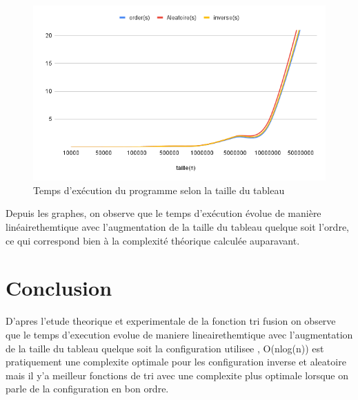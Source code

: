 \begin{figure}[H]
    \centering
        \includegraphics[scale=0.7]{ressources/chartfusion.png}
        \caption{Temps d'exécution du programme selon la taille du tableau}
    \label{fig:temps_exec_dico_theo}
\end{figure} 
\par
Depuis les graphes, on observe que le temps d’exécution évolue de manière linéairethemtique avec l’augmentation de la taille du tableau quelque soit l'ordre, ce qui correspond bien à la complexité théorique calculée auparavant.

\par
\section{Conclusion}
D'apres l'etude theorique et experimentale de la fonction tri fusion on observe que le temps d'execution evolue de maniere lineairethemtique avec l'augmentation de la taille du tableau quelque soit la configuration utilisee , O(nlog(n)) est pratiquement une complexite optimale pour les configuration inverse et aleatoire mais il y'a meilleur fonctions de tri avec une complexite plus optimale lorsque on parle de la configuration en bon ordre.
